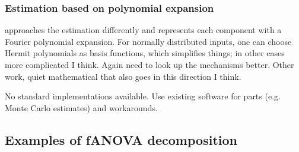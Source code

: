 \subsubsection*{Estimation based on polynomial expansion}
\cite{rahman2014} approaches the estimation differently and represents each component with a Fourier polynomial expansion. For normally distributed inputs, one can choose Hermit polynomials as basis functions, which simplifies things; in other cases more complicated I think.
Again need to look up the mechanisms better.
Other work, quiet mathematical that also goes in this direction I think.

No standard implementations available. Use existing software for parts (e.g. Monte Carlo estimates) and workarounds.

\subsection{Examples of fANOVA decomposition}


